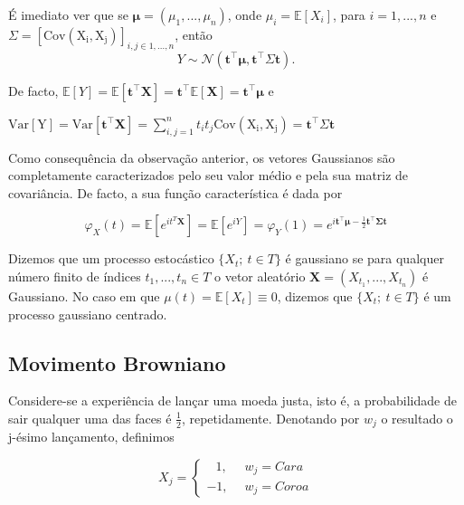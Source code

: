 \documentclass{article}
\begin{document}
\vspace{1cm}

É imediato ver que se  $\mathbf{\mu}=(\mu_1,...,\mu_n)$, onde $\mu_i=\mathbb{E}[X_i]$, para $i=1,...,n$ e $\Sigma=[\operatorname{Cov(X_i,X_j)}]_{i,j \in {1, ..., n}}$, então $$Y \sim \mathcal{N}(\mathbf{t}^\top\boldsymbol{\mu}, \mathbf{t}^{\top}\Sigma \mathbf{t}).$$

\vspace{0.5cm}
De facto, $\mathbb{E}[Y]=\mathbb{E}[\mathbf{t}^\top \mathbf{X}]=\mathbf{t}^\top \mathbb{E}[\mathbf{X}]=\mathbf{t}^\top \boldsymbol{\mu}$ e

$\operatorname{Var[Y]}=\operatorname{Var[\mathbf{t}^\top \mathbf{X}]}=\sum_{i,j=1}^n{t_it_j \operatorname{Cov(X_i,X_j)}}=\mathbf{t}^\top \Sigma \mathbf{t}$

\vspace{0.5cm}
Como consequência da observação anterior, os vetores Gaussianos são completamente caracterizados pelo seu valor médio e pela sua matriz de covariância. De facto, a sua função característica é dada por 

$$\varphi_X(t)=\mathbb{E}[e^{it^T\mathbf{X}}]=\mathbb{E}[e^{iY}]=\varphi_Y(1)=e^{i\mathbf{t}^\top\boldsymbol{\mu}-\frac{1}{2}\mathbf{t}^\top \mathbf{\Sigma} \mathbf{t}}$$

\vspace{1cm}

\begin{dfn}
Dizemos que um processo estocástico $\{X_t;\ t \in T\}$ é gaussiano se para qualquer número finito de índices $t_1,...,t_n \in T$ o vetor aleatório $\mathbf{X}=(X_{t_1},..., X_{t_n})$ é Gaussiano. 
No caso em que $\mu(t)=\mathbb{E}[X_t]\equiv0$, dizemos que $\{X_t;\ t \in T\}$ é um processo gaussiano centrado.
\end{dfn}

\vspace{2cm}

\subsection{Movimento Browniano}

Considere-se a experiência de lançar uma moeda justa, isto é, a probabilidade de sair qualquer uma das faces é $\frac{1}{2}$, repetidamente. Denotando por $w_j$ o resultado o j-ésimo lançamento, definimos

\begin{equation*}
    X_j= \begin{cases}
        \;\;\,1, \,\,\,\;\;\;w_j=Cara\\
        -1, \;\;\;\,\; w_j=Coroa
    \end{cases}
\end{equation*}
\end{document}
